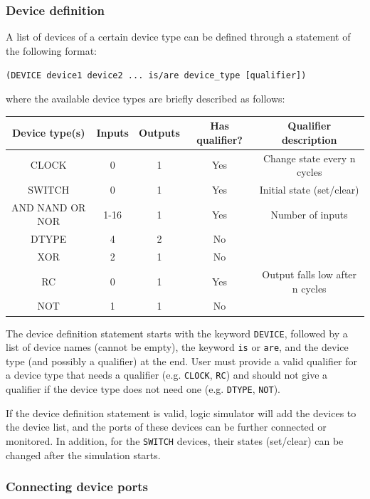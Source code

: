 \documentclass[10pt,a4paper]{article}
\begin{document}
\subsubsection{Device definition}
\label{sec:org99cb2bd}

A list of devices of a certain device type can be defined through a
statement of the following format:

\texttt{(DEVICE device1 device2 ... is/are device\_type [qualifier])}

where the available device types are briefly described as follows:
\begin{center}
\begin{tabular}{|c|c|c|c|c|}
\hline
Device type(s) & Inputs & Outputs & Has qualifier? & Qualifier description\\
\hline
CLOCK & 0 & 1 & Yes & Change state every n cycles\\
SWITCH & 0 & 1 & Yes & Initial state (set/clear)\\
AND NAND OR NOR & 1-16 & 1 & Yes & Number of inputs\\
DTYPE & 4 & 2 & No & \\
XOR & 2 & 1 & No & \\
RC & 0 & 1 & Yes & Output falls low after n cycles\\
NOT & 1 & 1 & No & \\
\hline
\end{tabular}
\end{center}

The device definition statement starts with the keyword \texttt{DEVICE},
followed by a list of device names (cannot be empty), the keyword \texttt{is}
or \texttt{are}, and the device type (and possibly a qualifier) at the end.
User must provide a valid qualifier for a device type that needs a
qualifier (e.g. \texttt{CLOCK}, \texttt{RC}) and should not give a qualifier if the
device type does not need one (e.g. \texttt{DTYPE}, \texttt{NOT}).

If the device definition statement is valid, logic simulator will add
the devices to the device list, and the ports of these devices can be
further connected or monitored. In addition, for the \texttt{SWITCH}
devices, their states (set/clear) can be changed after the simulation
starts.

\subsubsection{Connecting device ports}
\label{sec:orgaffd8c6}
\label{org6f6e406}
\end{document}
